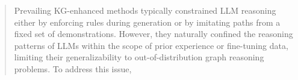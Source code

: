 \begin{abstract}
Prevailing KG-enhanced methods typically constrained LLM reasoning either by enforcing rules during generation or by imitating paths from a fixed set of demonstrations.
However, they naturally confined the reasoning patterns of LLMs within the scope of prior experience or fine-tuning data, limiting their generalizability to out-of-distribution graph reasoning problems.
To address this issue,

\end{abstract}

